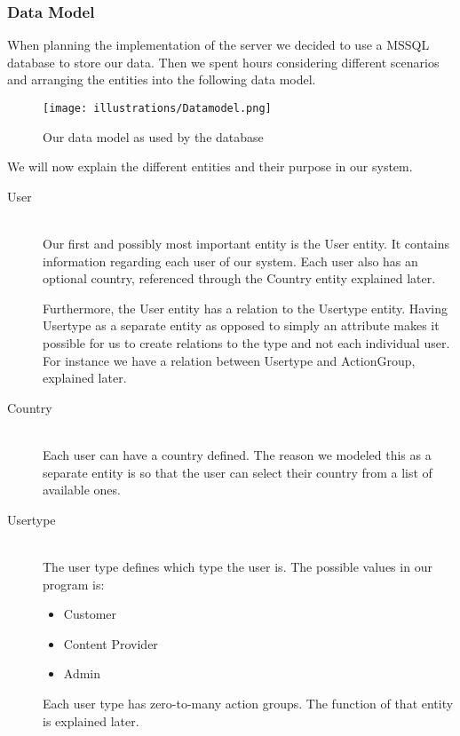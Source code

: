 \subsubsection{Data Model}
When planning the implementation of the server we decided to use a MSSQL database to store our data. Then we spent hours  considering different scenarios and arranging the entities into the following data model.
\begin{figure}[H]
  \texttt{[image: illustrations/Datamodel.png]}
  \caption{Our data model as used by the database}
  \label{fig:datamodel}
\end{figure}
We will now explain the different entities and their purpose in our system.

\begin{description}
\item[User] \hfill \\
Our first and possibly most important entity is the User entity. It contains information regarding each user of our system. Each user also has an optional  country, referenced through the Country entity  explained later.

Furthermore, the User entity has a relation to the Usertype entity. Having Usertype as a separate entity as opposed to simply an attribute makes it possible for us to create relations to the type and not each individual user. For instance we have a relation between Usertype and ActionGroup, explained later.

\item[Country] \hfill \\
Each user can have a country defined. The reason we modeled this as a separate entity is so that the user can select their country from a list of available ones.

\item[Usertype] \hfill \\
The user type defines which type the user is.  The possible values in our program is:
\begin{itemize}
	\item Customer
	\item Content Provider
	\item Admin
\end{itemize}

Each user type has zero-to-many action groups. The function of that entity is explained later.


\end{description}
